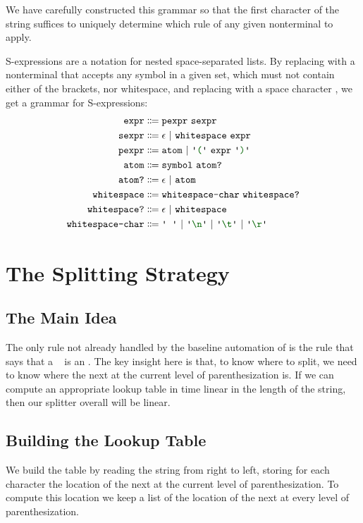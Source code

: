   We have carefully constructed this grammar so that the first character of the string suffices to uniquely determine which rule of any given nonterminal to apply.
  
  S-expressions are a notation for nested space-separated lists.  By replacing  with a nonterminal that accepts any symbol in a given set, which must not contain either of the brackets, nor whitespace, and replacing \terminal{+} with a space character \terminal{\ }, we get a grammar for S-expressions:
  \begin{align*}
    \nt{expr} & \Coloneqq \nt{pexpr}~\nt{sexpr} \\
    \nt{sexpr} & \Coloneqq \epsilon~|~\nt{whitespace}~\nt{expr} \\
    \nt{pexpr} & \Coloneqq \nt{atom}~|~\terminal{(}~\nt{expr}~\terminal{)} \\
    \nt{atom} & \Coloneqq \nt{symbol}~\nt{atom?} \\
    \nt{atom?} & \Coloneqq \epsilon~|~\nt{atom} \\
    \nt{whitespace} & \Coloneqq \nt{whitespace-char}~\nt{whitespace?} \\
    \nt{whitespace?} & \Coloneqq \epsilon~|~\nt{whitespace} \\
    \nt{whitespace-char} & \Coloneqq \terminal{\ }~|~\terminal{\textbackslash n}~|~\terminal{\textbackslash t}~|~\terminal{\textbackslash r}
  \end{align*}
  
\section{The Splitting Strategy}
  \subsection{The Main Idea}
    The only rule not already handled by the baseline automation of  is the rule that says that a ~ is an .  The key insight here is that, to know where to split, we need to know where the next \terminal{+} at the current level of parenthesization is.  If we can compute an appropriate lookup table in time linear in the length of the string, then our splitter overall will be linear.
    
  \subsection{Building the Lookup Table}
    We build the table by reading the string from right to left, storing for each character the location of the next \terminal{+} at the current level of parenthesization.  To compute this location we keep a list of the location of the next \terminal{+} at every level of parenthesization.
    
